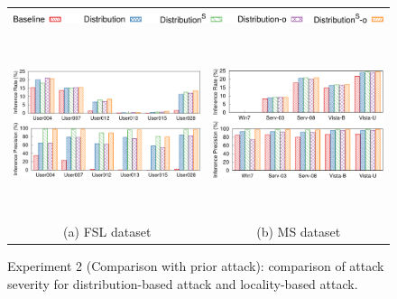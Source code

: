 \documentclass[bachelor]{thesis-uestc}
\begin{document}
\begin{figure}[t]
    \centering
    \begin{tabular}{c@{\hskip 2em}c}
        \multicolumn{2}{c}{\includegraphics[width=.7\textwidth]{pic/legend-fsl-bar.pdf}} \smallskip \\
        \includegraphics[height=2.1in]{pic/distribution-comparison-fsl.pdf} &
        \includegraphics[height=2.1in]{pic/distribution-comparison-ms.pdf} \medskip \\
        {\footnotesize 
        (a) FSL dataset 
        } &
        {\footnotesize
        (b) MS dataset 
        } \\
    \end{tabular}
    \caption{Experiment 2 (Comparison with prior attack): comparison of attack severity for distribution-based attack and locality-based attack.}
    \label{fig:distribution-comparison}
\end{figure}



\end{document}
